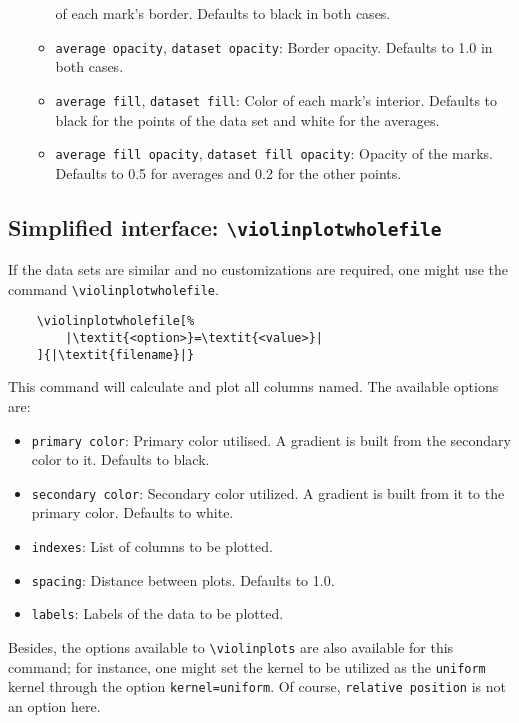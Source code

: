 \documentclass{article}
\begin{document}
\begin{itemize}
\begin{itemize}
			of each mark's border. Defaults to black in both
			cases.
		\item \texttt{average opacity}, \texttt{dataset opacity}:
			Border opacity. Defaults to 1.0 in both cases.
		\item \texttt{average fill}, \texttt{dataset fill}: Color
			of each mark's interior. Defaults to black for the
			points of the data set and white for the averages.
		\item \texttt{average fill opacity}, \texttt{dataset fill opacity}:
			Opacity of the marks. Defaults to 0.5 for averages and
			0.2 for the other points.
	\end{itemize}
\end{itemize}

\subsection{Simplified interface: \texttt{{\textbackslash}violinplotwholefile}}

If the data sets are similar and no customizations are required, one might
use the command \texttt{{\textbackslash}violinplotwholefile}.

\begin{verbatim}
	\violinplotwholefile[%
		|\textit{<option>}=\textit{<value>}|
	]{|\textit{filename}|}
\end{verbatim}

This command will calculate and plot all columns named. The available options
are:

\begin{itemize}
	\item \texttt{primary color}: Primary color utilised. A gradient is built from
		the secondary color to it. Defaults to black.
	\item \texttt{secondary color}: Secondary color utilized. A
		gradient is built from it to the primary color. Defaults
		to white.
	\item \texttt{indexes}: List of columns to be plotted.
	\item \texttt{spacing}: Distance between plots. Defaults to 1.0.
	\item \texttt{labels}: Labels of the data to be plotted.
\end{itemize}

Besides, the options available to \texttt{{\textbackslash}violinplots} are also
available for this command; for instance, one might set the kernel to
be utilized as the \texttt{uniform} kernel through the option
\texttt{kernel=uniform}. Of course, \texttt{relative position} is not an option
here.
\end{document}
